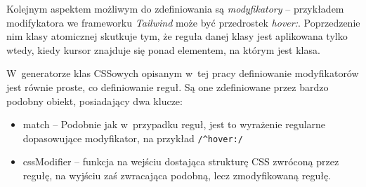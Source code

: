 \documentclass{SGGW-thesis}
\begin{document}
Kolejnym aspektem możliwym do zdefiniowania są \emph{modyfikatory} -- przykładem modifykatora we frameworku \emph{Tailwind} może być przedrostek \emph{hover:}. Poprzedzenie nim klasy atomicznej skutkuje tym, że reguła danej klasy jest aplikowana tylko wtedy, kiedy kursor znajduje się ponad elementem, na którym jest klasa.

W~generatorze klas CSSowych opisanym w~tej pracy definiowanie modyfikatorów jest równie proste, co definiowanie reguł. Są one zdefiniowane przez bardzo podobny obiekt, posiadający dwa klucze:
\begin{itemize}
    \item match -- Podobnie jak w~przypadku reguł, jest to wyrażenie regularne dopasowujące modyfikator, na przykład \verb|/^hover:/|
    \item cssModifier -- funkcja na wejściu dostająca strukturę CSS zwróconą przez regułę, na wyjściu zaś zwracająca podobną, lecz zmodyfikowaną regułę.
\end{itemize}
\end{document}
